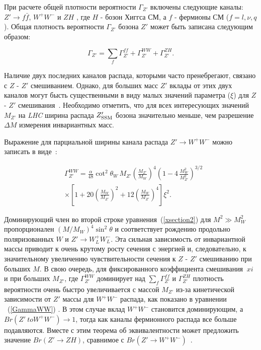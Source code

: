 При расчете общей плотности вероятности $ \Gamma_ {Z '} $ включены следующие каналы: $ Z' \to f \bar f $, $ W ^ + W ^ - $ и $ ZH $ \cite{2part-pankov}, где $ H $ - бозон Хиггса СМ, а $ f $ - фермионы СМ ($ f = l, \nu, q $). Общая плотность вероятности $ \Gamma_ {Z '} $ бозона $ Z' $ может быть записана следующим образом:

\begin{equation}\label{gamma2}
\Gamma_{Z'} = \sum_f \Gamma_{Z'}^{ff} + \Gamma_{Z'}^{WW} +
\Gamma_{Z'}^{ZH}.
\end{equation}

Наличие двух последних каналов распада, которыми часто пренебрегают, связано с  $ Z $ - $ Z '$ смешиванием. Однако, для больших масс $ Z '$ вклады от этих двух каналов могут бысть существенными в виду малых значений параметра ($ \xi $) для $ Z $ - $ Z' $ смешивания~\cite{2part-pankov}. Необходимо отметить, что для всех интересующих значений $ M_ {Z '} $ на \textit{LHC} ширина распада $ Z' _ {\rm SSM} $  бозона значительно меньше, чем разрешение $ \Delta M $ измерения инвариантных масс.

Выражение для парциальной ширины канала распада $ Z '\to W ^ + W ^ - $ можно записать в виде~\cite{2part-pankov}:

\begin{align}
&\Gamma_{Z'}^{WW}=\frac{\alpha}{48}\cot^2\theta_W\, M_{Z'}
\left(\frac{M_{Z'}}{M_W}\right)^4\left(1-4\,\frac{M_W^2}{M_{Z'}^2}\right)^{3/2} \nonumber \\
& \times \left[ 1+20 \left(\frac{M_W}{M_{Z'}}\right)^2 + 12
\left(\frac{M_W}{M_{Z'}}\right)^4\right]\xi^2. \label{GammaWW}
\end{align}

Доминирующий член во второй строке уравнения~(\ref{xsection2}) для $ M ^ 2 \gg M_W ^ 2 $ пропорционален $ (M / M_W) ^ 4 \sin ^ 2 \theta $ и соответствует рождению продольно поляризованных $ W $ и $ Z'\to W^+_LW^-_L $. Эта сильная зависимость от инвариантной массы приводит к очень крутому росту сечения с энергией и, следовательно, к значительному увеличению чувствительности сечения к $ Z $ - $ Z '$ смешиванию при больших $ M $. В свою очередь, для фиксированного коэффициента смешивания $ \ xi $ и при больших $ M_ {Z '} $, где $ \Gamma_ {Z'} ^ {WW} $ доминирует над $ \sum_f \Gamma_ {Z '} ^ {ff } $ и $ \Gamma_ {Z '} ^ {ZH} $ плотность вероятности очень быстро увеличивается с массой $ M_ {Z'} $ из-за кинетической зависимости от $ Z '$ массы для $ W ^ + W ^ - $ распада, как показано в уравнении ~(\ref{GammaWW})
\cite{2part-pankov}. В этом случае вклад $ W ^ + W ^ - $ становится доминирующим, а $ {Br} (Z '\ to W ^ + W ^ -) \to 1 $, тогда как каналы фермионного распада все больше подавляются. Вместе с этим теорема об эквивалентности может предложить значение $ {Br} (Z'\to ZH) $, сравнимое с $ {Br} (Z' \to W ^ + W ^ -) $~\cite{2part-pankov}.